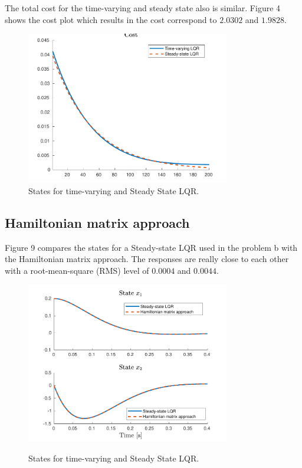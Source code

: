 \documentclass{article}
\begin{document}
The total cost for the time-varying and steady state also is similar. Figure 4 shows the cost plot which results in the cost correspond to $2.0302$ and $1.9828$.

\begin{figure}[H]
\centering
\includegraphics [width=3.5in]{cost2}
\caption{States for time-varying and Steady State LQR.}
\end{figure}

\subsection*{Hamiltonian matrix approach}

Figure 9 compares the states for a Steady-state LQR used in the problem b with the Hamiltonian matrix approach. The responses are really close to each other with a root-mean-square (RMS) level of $0.0004$ and $0.0044$.

\begin{figure}[H] 
\centering
\includegraphics [width=3.5in]{states3} \label{states3}
\caption{States for time-varying and Steady State LQR.}
\end{figure}
\end{document}
